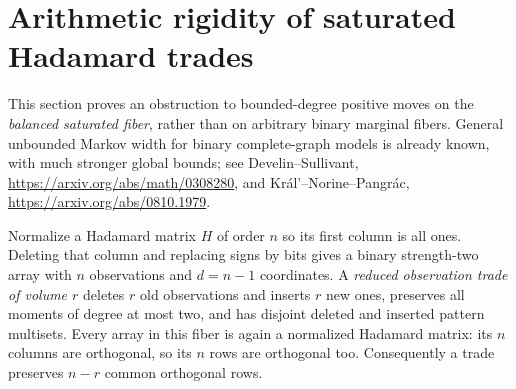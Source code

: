 \section{Arithmetic rigidity of saturated Hadamard trades}
This section proves an obstruction to bounded-degree positive moves on the
\emph{balanced saturated fiber}, rather than on arbitrary binary marginal
fibers. General unbounded Markov width for binary complete-graph models is
already known, with much stronger global bounds; see Develin--Sullivant,
\url{https://arxiv.org/abs/math/0308280}, and
Kr\'al'--Norine--Pangr\'ac,
\url{https://arxiv.org/abs/0810.1979}.

Normalize a Hadamard matrix $H$ of order $n$ so its first column is all
ones. Deleting that column and replacing signs by bits gives a binary
strength-two array with $n$ observations and $d=n-1$ coordinates.
A \emph{reduced observation trade of volume $r$} deletes $r$ old
observations and inserts $r$ new ones, preserves all moments of degree at
most two, and has disjoint deleted and inserted pattern multisets.
Every array in this fiber is again a normalized Hadamard matrix: its
$n$ columns are orthogonal, so its $n$ rows are orthogonal too.
Consequently a trade preserves $n-r$ common orthogonal rows.

